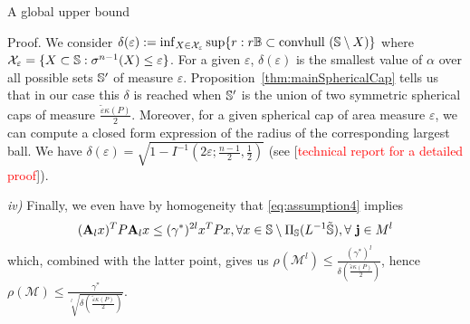 \begin{subsection}{A global upper bound}
\begin{pf*}{Proof.}
We consider $\delta(\varepsilon) := \inf_{X \in \mathcal{X}_{\varepsilon}} \sup\{r: r\mathbb{B} \subset \mbox{convhull }(\mathbb{S} \setminus X)\}$ where $\mathcal{X}_{\varepsilon} = \{ X \subset \mathbb{S}: \sigma^{n-1}(X) \leq \varepsilon \}$. For a given $\varepsilon$, $\delta(\varepsilon)$ is the smallest value of $\alpha$ over all possible sets $\mathbb{S}'$ of measure $\varepsilon$. Proposition~\ref{thm:mainSphericalCap} tells us that in our case this $\delta$ is reached when $\mathbb{S}'$ is the union of two symmetric spherical caps of measure $\frac{\tilde{\varepsilon} \kappa(P)}{2}$. Moreover, for a given spherical cap of area measure $\varepsilon$, we can compute a closed form expression of the radius of the corresponding largest ball. We have $\delta(\varepsilon)= \sqrt{1- I^{-1} \left( 2\varepsilon; \frac{n-1}{2}, \frac{1}{2} \right)}$ (see [\textcolor{red}{technical report for a detailed proof}]).

\textit{iv)} Finally, we even have by homogeneity that \eqref{eq:assumption4} implies
\begin{equation*}\label{eqn:P1}
(\mathbf{A}_l x)^T P \mathbf{A}_l x \leq (\gamma^*)^{2l} x^T P x,  \forall x \in \mathbb{S} \setminus \Pi_{\mathbb{S}}(L^{-1}\tilde{\mathbb{S}}), \forall\ \mathbf{j} \in M^l
\end{equation*}
which, combined with the latter point, gives us $\rho(\mathcal{M}^l) \leq \frac{(\gamma^*)^l}{\delta(\frac{\tilde{\varepsilon} \kappa(P)}{2})}$, hence $\rho(\mathcal{M}) \leq \frac{\gamma^{*}}{\sqrt[l]{\delta \left( \frac{\tilde{\varepsilon} \kappa(P)}{2} \right)}}$.
\end{pf*}
\end{subsection}
